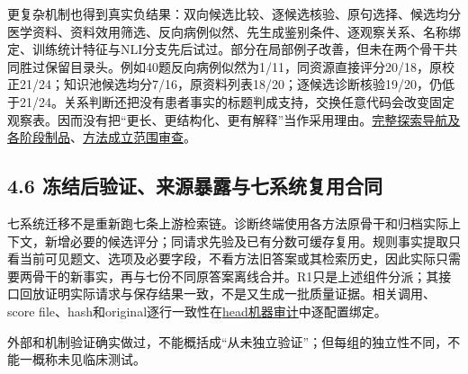 \documentclass[
  11pt,
  a4paper,
]{article}
\begin{document}
更复杂机制也得到真实负结果：双向候选比较、逐候选核验、原句选择、候选均分医学资料、资料效用筛选、反向病例似然、先生成鉴别条件、逐观察关系、名称绑定、训练统计特征与NLI分支先后试过。部分在局部例子改善，但未在两个骨干共同胜过保留目录头。例如40题反向病例似然为1/11，同资源直接评分20/18，原校正21/24；知识池候选均分7/16，原资料列表18/20；逐候选诊断核验19/20，仍低于21/24。关系判断还把没有患者事实的标题判成支持，交换任意代码会改变固定观察表。因而没有把``更长、更结构化、更有解释''当作采用理由。\href{https://github.com/xiotakut/cf_mrg/blob/main/papers/2026-10-02_cf_moa/author_dossier/records/research/r3_candidate_comparison.md\#L970}{完整探索导航及各阶段制品}、\href{https://github.com/xiotakut/cf_mrg/blob/main/papers/2026-10-02_cf_moa/author_dossier/records/research/r3_candidate_comparison.md\#L1924}{方法成立范围审查}。

\subsection{4.6
冻结后验证、来源暴露与七系统复用合同}\label{ux51bbux7ed3ux540eux9a8cux8bc1ux6765ux6e90ux66b4ux9732ux4e0eux4e03ux7cfbux7edfux590dux7528ux5408ux540c}

七系统迁移不是重新跑七条上游检索链。诊断终端使用各方法原骨干和归档实际上下文，新增必要的候选评分；同请求先验及已有分数可缓存复用。规则事实提取只看当前可见题文、选项及必要字段，不看方法旧答案或其检索历史，因此实际只需要两骨干的新事实，再与七份不同原答案离线合并。R1只是上述组件分派；其接口回放证明实际请求与保存结果一致，不是又生成一批质量证据。相关调用、score
file、hash和original逐行一致性在\href{https://github.com/xiotakut/cf_mrg/blob/main/papers/2026-10-02_cf_moa/author_dossier/sources/05945deac18d_head_research_audit.json}{head机器审计}中逐配置绑定。

外部和机制验证确实做过，不能概括成``从未独立验证''；但每组的独立性不同，不能一概称未见临床测试。
\end{document}
